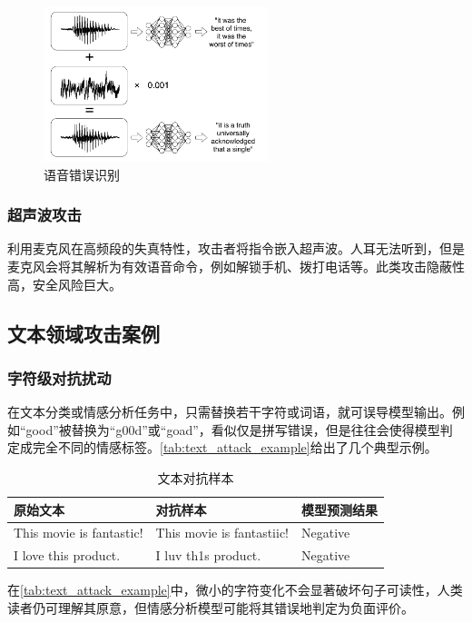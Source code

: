 \documentclass[main]{IEEEtran}
\begin{document}
\begin{figure}[H]
    \centering
    \includegraphics[height=4.5cm]{fig/yuying}
    \caption{语音错误识别}
    \label{fig:yuying}
\end{figure}

\subsubsection{超声波攻击}
利用麦克风在高频段的失真特性，攻击者将指令嵌入超声波\cite{roy2017inaudible}。人耳无法听到，但是麦克风会将其解析为有效语音命令，例如解锁手机、拨打电话等。此类攻击隐蔽性高，安全风险巨大。

\subsection{文本领域攻击案例}
\subsubsection{字符级对抗扰动}

在文本分类或情感分析任务中，只需替换若干字符或词语，就可误导模型输出\cite{ebrahimi2017hotflip, li2019textbugger}。例如“good”被替换为“g00d”或“goad”，看似仅是拼写错误，但是往往会使得模型判定成完全不同的情感标签。\autoref{tab:text_attack_example}给出了几个典型示例。

\begin{table}[htbp]
    \centering
    \caption{文本对抗样本}
    \label{tab:text_attack_example}
    \begin{tabular}{lll}
        \toprule
        原始文本 & 对抗样本 & 模型预测结果   \\
        \midrule
        This movie is fantastic! & This movie is fantastiic! & Negative \\
        I love this product.     & I luv th1s product.       & Negative \\
        \bottomrule
    \end{tabular}
\end{table}

在\autoref{tab:text_attack_example}中，微小的字符变化不会显著破坏句子可读性，人类读者仍可理解其原意，但情感分析模型可能将其错误地判定为负面评价\cite{li2019textbugger}。
\end{document}
